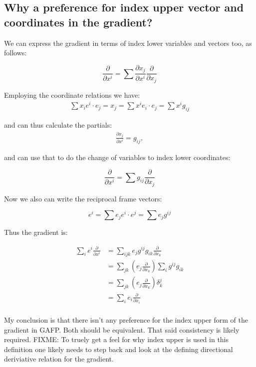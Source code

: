 \documentclass{article}      %
\begin{document}

\subsection{ Why a preference for index upper vector and coordinates in the gradient? }

We can express the gradient in terms of index lower variables and vectors too, as follows:

\begin{equation*}
\frac{\partial}{\partial x^i} = \sum \frac{\partial x_j}{\partial x^i} \frac{\partial}{\partial x_j}
\end{equation*}

Employing the coordinate relations we have:
\begin{align*}
\sum x_i e^i \cdot e_j = x_j = \sum x^i e_i \cdot e_j = \sum x^i g_{ij}
\end{align*}

and can thus calculate the partials:
\begin{align*}
\frac{\partial x_j}{\partial x^i} = g_{ij},
\end{align*}

and can use that to do the change of variables to index lower coordinates:

\begin{equation*}
\frac{\partial}{\partial x^i} = \sum g_{ij} \frac{\partial}{\partial x_j}
\end{equation*}

Now we also can write the reciprocal frame vectors:

\begin{equation*}
e^i = \sum e_j e^i \cdot e^j = \sum e_j g^{ij}
\end{equation*}

Thus the gradient is:

\begin{align*}
\sum_i e^i \frac{\partial}{\partial x^i}
&= \sum_{ijk} e_j g^{ij} g_{ik} \frac{\partial}{\partial x_k} \\
&= \sum_{jk} \left(e_j \frac{\partial}{\partial x_k} \right) \sum_i g^{ij} g_{ik} \\
&= \sum_{jk} \left(e_j \frac{\partial}{\partial x_k} \right) \delta_k^j \\
&= \sum_{i} e_i \frac{\partial}{\partial x_i} \\ 
\end{align*}

My conclusion is that there isn't any preference for the index upper form of the gradient in GAFP.  Both should be equivalent.  That said consistency is likely required.  FIXME: To truely get a feel for why index upper is used in this definition one likely needs to step back and look at the defining directional deriviative relation for the gradient.
\end{document}
